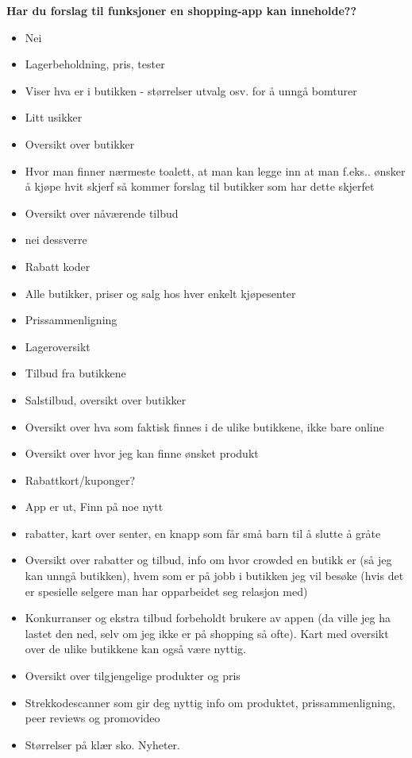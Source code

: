 \noindent \large{\textbf{Har du forslag til funksjoner en shopping-app kan inneholde??}}
\begin{itemize}
    \item Nei
    \item Lagerbeholdning, pris, tester
    \item Viser hva er i butikken - størrelser utvalg osv. for å unngå bomturer
    \item Litt usikker
    \item Oversikt over butikker
    \item Hvor man finner nærmeste toalett, at man kan legge inn at man f.eks.. ønsker å kjøpe hvit skjerf så kommer forslag til butikker som har dette skjerfet
    \item Oversikt over nåværende tilbud
    \item nei dessverre
    \item Rabatt koder
    \item Alle butikker, priser og salg hos hver enkelt kjøpesenter
    \item Prissammenligning
    \item Lageroversikt
    \item Tilbud fra butikkene
    \item Salstilbud, oversikt over butikker
    \item Oversikt over hva som faktisk finnes i de ulike butikkene, ikke bare online
    \item Oversikt over hvor jeg kan finne ønsket produkt
    \item Rabattkort/kuponger?
    \item App er ut, Finn på noe nytt
    \item rabatter, kart over senter, en knapp som får små barn til å slutte å gråte
    \item Oversikt over rabatter og tilbud, info om hvor crowded en butikk er (så jeg kan unngå butikken), hvem som er på jobb i butikken jeg vil besøke (hvis det er spesielle selgere man har opparbeidet seg relasjon med)
    \item Konkurranser og ekstra tilbud forbeholdt brukere av appen (da ville jeg ha lastet den ned, selv om jeg ikke er på shopping så ofte). Kart med oversikt over de ulike butikkene kan også være nyttig.
    \item Oversikt over tilgjengelige produkter og pris
    \item Strekkodescanner som gir deg nyttig info om produktet, prissammenligning, peer reviews og promovideo
    \item Størrelser på klær sko. Nyheter.

\end{itemize}
